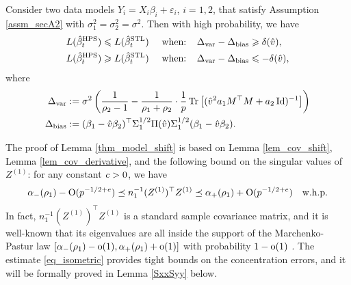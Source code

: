 \begin{lemma}%
\label{thm_model_shift}
Consider two data models $Y_i = X_i\beta_i + \varepsilon_i$, $i=1,2$, that satisfy Assumption \ref{assm_secA2} with $\sigma_1^2=\sigma_2^2=\sigma^2$. Then with high probability, we have
	\begin{align}
	 	L(\hat{\beta}_{t}^{\textup{HPS}}) \leqslant L(\hat{\beta}_t^{\textup{STL}}) \quad \text{ when: } \ \ &\Delta_{\text{var}} - \Delta_{\text{bias}} \geqslant   \delta(\hat v), \label{upper}\\
		L(\hat{\beta}_t^{\textup{HPS}}) \geqslant L(\hat{\beta}_t^{\textup{STL}}) \quad \text{ when: } \ \ &\Delta_{\text{var}} - \Delta_{\text{bias}} \leqslant - \delta(\hat v), \label{lower}
	\end{align}
	where
	\begin{align} %
		\Delta_{\vari} &\define {\sigma^2}\bigbrace{\frac{1}{\rho_2 - 1} -  \frac{1}{\rho_1 + \rho_2}\cdot \frac1p \bigtr{( \hat v^2 a_1 M^{\top}M +  a_2\id)^{-1}} } \label{Deltavarv} \\
		\Delta_{\bias} &\define (\beta_1 - \hat{v}\beta_2)^{\top} \Sigma_1^{1/2} \Pi (\hat v)\Sigma_1^{1/2} (\beta_1 - \hat{v}\beta_2). \label{Deltabetav}
	\end{align}
\end{lemma}

The proof of Lemma \ref{thm_model_shift} is based on Lemma \ref{lem_cov_shift}, Lemma \ref{lem_cov_derivative}, and the following bound on the singular values of $Z^{(1)}$: for any constant ${\mathit{c}}>0$, we have
\begin{align}
\alpha_-(\rho_1) - \operatorname{O}(p^{-1/2+e})  \preceq {n_1^{-1}}{(Z^{(1)})^{\top} Z^{(1)}}  \preceq   \alpha_+(\rho_1) + \operatorname{O}(p^{-1/2+e}) \quad \text{w.h.p.}  \label{eq_isometric}
\end{align}
In fact, $n_1^{-1}(Z^{(1)})^{\top}Z^{(1)}$ is a standard sample covariance matrix, and it is well-known that its eigenvalues are all inside the support of the Marchenko-Pastur law $[\alpha_-(\rho_1)-\operatorname{o}(1) ,\alpha_+(\rho_1)+\operatorname{o}(1)]$ with probability $1-\operatorname{o}(1)$ \cite{No_outside}. The estimate \eqref{eq_isometric} provides tight bounds on the concentration errors, and it will be formally proved in Lemma \ref{SxxSyy} below.

